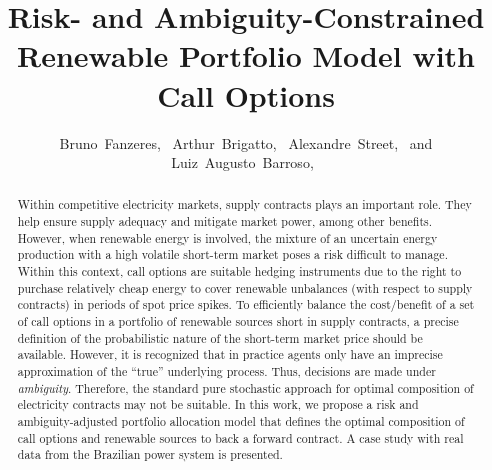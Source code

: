 \documentclass[a4paper]{IEEEtran}
\begin{document}
\title{Risk- and Ambiguity-Constrained Renewable Portfolio Model with Call Options}

\author{Bruno~Fanzeres,~
		Arthur~Brigatto,~
	    Alexandre~Street,~	
        and Luiz~Augusto~Barroso,~

}

\maketitle
\begin{abstract}
	Within competitive electricity markets, supply contracts plays an important role. They help ensure supply adequacy and mitigate market power, among other benefits. However, when renewable energy is involved, the mixture of an uncertain energy production with a high volatile short-term market poses a risk difficult to manage. Within this context, call options are suitable hedging instruments due to the right to purchase relatively cheap energy to cover renewable unbalances (with respect to supply contracts) in periods of spot price spikes. To efficiently balance the cost/benefit of a set of call options in a portfolio of renewable sources short in supply contracts, a precise definition of the probabilistic nature of the short-term market price should be available. However, it is recognized that in practice agents only have an imprecise approximation of the ``true'' underlying process. Thus, decisions are made under \textit{ambiguity}. Therefore, the standard pure stochastic approach for optimal composition of electricity contracts may not be suitable. In this work, we propose a risk and ambiguity-adjusted portfolio allocation model that defines the optimal composition of call options and renewable sources to back a forward contract. A case study with real data from the Brazilian power system is presented.
\end{abstract}
\end{document}
